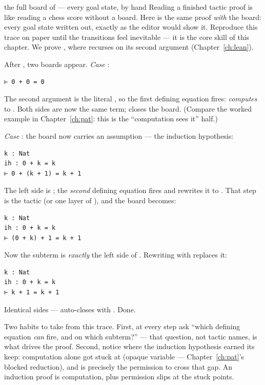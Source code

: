 \begin{worked}{the full board of  --- every goal state, by hand}
Reading a finished tactic proof is like reading a chess score without a
board. Here is the same proof \emph{with} the board: every goal state
written out, exactly as the editor would show it. Reproduce this trace on
paper until the transitions feel inevitable --- it is the core skill of
this chapter. We prove , where \lean{+} recurses on its
second argument (Chapter~\ref{ch:lean}).

\smallskip
\noindent After , two boards appear.
\emph{Case} :
\begin{lstlisting}
⊢ 0 + 0 = 0
\end{lstlisting}
The second argument is the literal , so the first defining
equation fires:  \emph{computes} to . Both sides are
now the same term;  closes the board. (Compare the worked
example in Chapter~\ref{ch:pat}: this is the ``computation sees it'' half.)

\smallskip
\noindent\emph{Case} : the board now carries an assumption ---
the induction hypothesis:
\begin{lstlisting}
k : Nat
ih : 0 + k = k
⊢ 0 + (k + 1) = k + 1
\end{lstlisting}
The left side is ; the \emph{second} defining
equation fires and rewrites it to . That step is the
tactic  (or one layer of
), and the board becomes:
\begin{lstlisting}
k : Nat
ih : 0 + k = k
⊢ (0 + k) + 1 = k + 1
\end{lstlisting}
Now the subterm  is \emph{exactly} the left side of .
Rewriting with  replaces it:
\begin{lstlisting}
k : Nat
ih : 0 + k = k
⊢ k + 1 = k + 1
\end{lstlisting}
Identical sides ---  auto-closes with . Done.

\smallskip
Two habits to take from this trace. First, at every step ask ``which
defining equation \emph{can} fire, and on which subterm?'' --- that
question, not tactic names, is what drives the proof. Second, notice
where the induction hypothesis earned its keep: computation alone got
stuck at  (opaque variable --- Chapter~\ref{ch:pat}'s blocked
reduction), and  is precisely the permission to cross that gap.
An induction proof is computation, plus permission slips at the stuck
points.
\end{worked}

